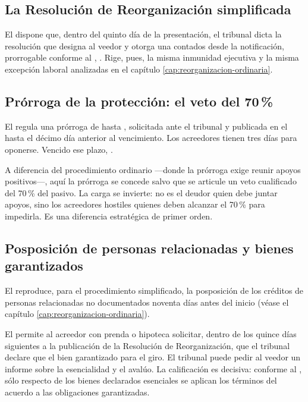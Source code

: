 \subsection{La Resolución de Reorganización simplificada}

El  dispone que, dentro del quinto día de la presentación, el tribunal dicta la
resolución que designa al veedor y otorga una \pfc{}  contados
desde la notificación, prorrogable conforme al , . Rige, pues, la misma inmunidad ejecutiva y la misma excepción
laboral analizadas en el capítulo \ref{cap:reorganizacion-ordinaria}.

\subsection{Prórroga de la protección: el veto del 70\,\%}

El  regula una prórroga de hasta , solicitada ante el
tribunal y publicada en el \boletin{} hasta el décimo día anterior al vencimiento. Los
acreedores tienen tres días para oponerse. Vencido ese plazo, .

\begin{foco}
A diferencia del procedimiento ordinario ---donde la prórroga exige reunir apoyos
positivos---, aquí la prórroga se concede salvo que se articule un veto cualificado del
70\,\% del pasivo. La carga se invierte: no es el deudor quien debe juntar apoyos, sino los
acreedores hostiles quienes deben alcanzar el 70\,\% para impedirla. Es una diferencia
estratégica de primer orden.
\end{foco}

\subsection{Posposición de personas relacionadas y bienes garantizados}

El  reproduce, para el procedimiento simplificado, la posposición de los créditos
de personas relacionadas no documentados noventa días antes del inicio (véase el capítulo
\ref{cap:reorganizacion-ordinaria}).

El  permite al acreedor con prenda o hipoteca solicitar, dentro de los quince
días siguientes a la publicación de la Resolución de Reorganización, que el tribunal declare
que el bien garantizado  para el giro. El tribunal puede pedir al
veedor un informe sobre la esencialidad y el avalúo. La calificación es decisiva: conforme
al , sólo respecto de los bienes declarados esenciales se aplican los términos
del acuerdo a las obligaciones garantizadas.

